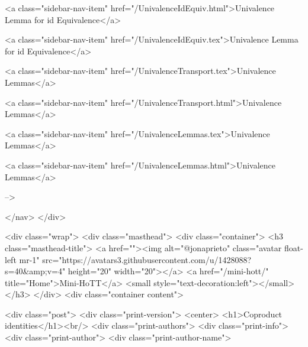       
    
      
        
          <a class="sidebar-nav-item" href="/UnivalenceIdEquiv.html">Univalence Lemma for id Equivalence</a>
        
      
    
      
        
          <a class="sidebar-nav-item" href="/UnivalenceIdEquiv.tex">Univalence Lemma for id Equivalence</a>
        
      
    
      
        
          <a class="sidebar-nav-item" href="/UnivalenceTransport.tex">Univalence Lemmas</a>
        
      
    
      
        
          <a class="sidebar-nav-item" href="/UnivalenceTransport.html">Univalence Lemmas</a>
        
      
    
      
        
          <a class="sidebar-nav-item" href="/UnivalenceLemmas.tex">Univalence Lemmas</a>
        
      
    
      
        
          <a class="sidebar-nav-item" href="/UnivalenceLemmas.html">Univalence Lemmas</a>
        
      
     -->

  </nav>
</div>

    <div class="wrap">
      <div class="masthead">
        <div class="container">
          <h3 class="masthead-title">
            <a href=""><img alt="@jonaprieto" class="avatar float-left mr-1" src="https://avatars3.githubusercontent.com/u/1428088?s=40&amp;v=4" height="20" width="20"></a>
            <a href="/mini-hott/" title="Home">Mini-HoTT</a>
            <small style="text-decoration:left"></small>
          </h3>
        </div>
      <div class="container content">
        







<div class="post">
  <div class="print-version">
    <center>
      <h1>Coproduct identities</h1><br/>
        <div class="print-authors">
          <div class="print-info">
            <div class="print-author">
              <div class="print-author-name">
                

